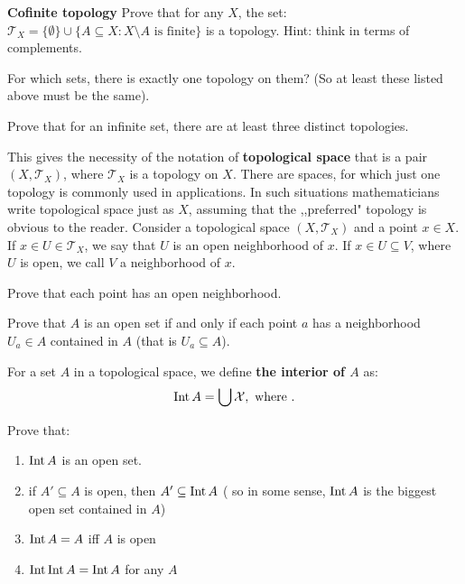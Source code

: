 \begin{prob}
	\textbf{Cofinite topology} Prove that for any $X$, the set:
  $\mathcal T_X=\{\emptyset\}\cup \{A\subseteq X : X\setminus A \text{ is finite}\}$ is a topology. Hint: think in terms of complements.
\end{prob}

\begin{prob}
	For which sets, there is exactly one topology on them? (So at least
  these listed above must be the same).
\end{prob}

\begin{prob}
	Prove that for an infinite set, there are at least three distinct
  topologies.
\end{prob}

\noindent This gives the necessity of the notation of \textbf{topological space} that is a pair $(X,\mathcal T_X)$, where $\mathcal T_X$ is a topology on
$X$. There are spaces, for which just one topology is commonly used in applications. In such situations mathematicians write topological space just as
$X$, assuming that the ,,preferred" topology is obvious to the reader.
Consider a topological space $(X,\mathcal T_X)$ and a point $x\in X$.
If $x\in U\in \mathcal T_X$, we say that $U$ is an open neighborhood
of $x$. If $x\in U\subseteq V$, where $U$ is open, we call $V$ a
neighborhood of $x$.

\begin{prob}
  Prove that each point has an open neighborhood.
\end{prob}

\begin{prob}
  Prove that $A$ is an open set if and only if each point $a$ has
  a neighborhood $U_a\in A$ contained in $A$
  (that is $U_a\subseteq A$).
\end{prob}

\noindent For a set $A$ in a topological space, we define \textbf{the
interior of $A$} as:
$$\text{Int\,} A=\bigcup \mathcal X, \text{ where }.$$

\begin{prob}
  Prove that:
  \begin{enumerate}
    \item $\text{Int\,} A$ is an open set.
    \item if $A'\subseteq A$ is open, then $A'\subseteq \text{Int\,} A$ (
    so in some sense, $\text{Int\,} A$ is the biggest open set contained in
    $A$)
    \item $\text{Int\,} A = A$ iff $A$ is open
    \item $\text{Int\,} \text{Int\,} A = \text{Int\,} A$ for any $A$
  \end{enumerate}
\end{prob}

